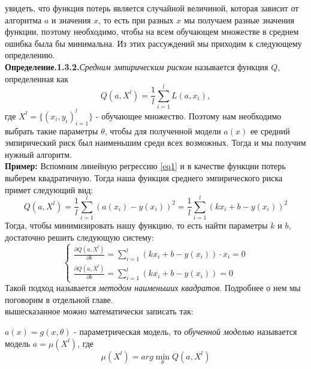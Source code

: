 \documentclass[a4paper,12pt]{article}
\begin{document}
 увидеть, что функция потерь является случайной величиной, которая зависит от алгоритма $a$ и значения $x$, то есть при разных $x$ мы получаем разные значения функции, поэтому необходимо, чтобы на всем обучающем множестве в среднем ошибка была бы минимальна. Из этих рассуждений мы приходим к следующему определению.\\

\noindent\textbf{Определение.1.3.2.}\textit{Средним эмпирическим риском} называется функция $Q$, определенная как
\begin{equation*}
    Q(a, X^l)=\frac{1}{l} \sum_{i=1}^lL(a, x_i), 
\end{equation*}
где $X^l = \{(x_i,y_i)_{i=1}^l\}$ - обучающее множество. Поэтому нам необходимо выбрать такие параметры $\theta$, чтобы для полученной модели $a(x)$ ее средний эмпирический риск был наименьшим среди всех возможных. Тогда и мы получим нужный алгоритм.\\

\noindent\textbf{Пример:}
Вспомним линейную регрессию \ref{eq1} и в качестве функции потерь выберем квадратичную. Тогда наша функция среднего эмпирического риска примет следующий вид:
\begin{equation*}
    Q(a, X^l)=\frac{1}{l}\sum_{i=1}^l(a(x_i)-y(x_i))^2 = \frac{1}{l}\sum_{i=1}^l(kx_i+b-y(x_i))^2
\end{equation*}
Тогда, чтобы минимизировать нашу функцию, то есть найти параметры $k$ и $b$, достаточно решить следующую систему:
\begin{equation*}
\begin{cases}
 \frac{\partial Q(a, X^l)}{\partial k} = \sum\limits_{i=1}^l(kx_i+b-y(x_i))\cdot x_i = 0\\
 \frac{\partial Q(a, X^l)}{\partial b} = \sum\limits_{i=1}^l(kx_i+b-y(x_i))=0
\end{cases}
\end{equation*}
Такой подход называется \textit{методом наименьших квадратов}. Подробнее о нем мы поговорим в отдельной главе.\\

 вышесказанное можно математически записать так:

 $a(x)=g(x,\theta)$ - параметрическая модель, то \textit{обученной моделью} называется модель $a=\mu(X^l)$, где
\begin{equation*}
    \mu(X^l)=arg\min\limits_\theta Q(a,X^l)
\end{equation*}
\end{document}
